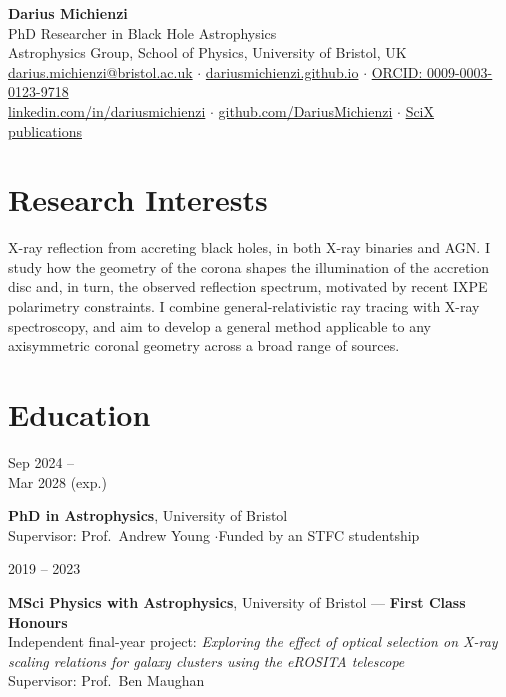 \documentclass[10pt,a4paper]{article}
\newcommand{\datewidth}{2.7cm}
\newcommand{\entry}[2]{%
  \par\noindent
  \begin{minipage}[t]{\datewidth}\raggedright\leavevmode\small\color{muted}\strut#1\end{minipage}%
  \hspace{0.4cm}%
  \begin{minipage}[t]{\dimexpr\textwidth-\datewidth-0.4cm\relax}\strut#2\strut\end{minipage}%
  \par\vspace{0.3em}}
\begin{document}
 
\begin{center}
  {\sffamily\fontsize{24}{28}\selectfont\bfseries Darius Michienzi}\\[0.4em]
  {\sffamily\color{muted} PhD Researcher in Black Hole Astrophysics}\\[0.5em]
  \small
  Astrophysics Group, School of Physics, University of Bristol, UK\\[0.2em]
  \href{mailto:darius.michienzi@bristol.ac.uk}{darius.michienzi@bristol.ac.uk}
  \quad$\cdot$\quad
  \href{https://dariusmichienzi.github.io}{dariusmichienzi.github.io}
  \quad$\cdot$\quad
  \href{https://orcid.org/0009-0003-0123-9718}{ORCID: 0009-0003-0123-9718}\\[0.2em]
  \href{https://www.linkedin.com/in/dariusmichienzi/}{linkedin.com/in/dariusmichienzi}
  \quad$\cdot$\quad
  \href{https://github.com/DariusMichienzi}{github.com/DariusMichienzi}
  \quad$\cdot$\quad
  \href{https://scixplorer.org/public-libraries/hmp3dQ2qQLWARLEJTIT1ng}{SciX publications}
\end{center}
 
\section{Research Interests}
X-ray reflection from accreting black holes, in both X-ray binaries and AGN.
I study how the geometry of the corona shapes the illumination of the accretion
disc and, in turn, the observed reflection spectrum, motivated by recent
IXPE polarimetry constraints. I combine general-relativistic ray tracing with
X-ray spectroscopy, and aim to develop a general method applicable to any
axisymmetric coronal geometry across a broad range of sources.
 
\section{Education}
\entry{Sep 2024 -- \\ Mar 2028 (exp.)}{%
  \textbf{PhD in Astrophysics}, University of Bristol\\
  Supervisor: Prof.\ Andrew Young \quad$\cdot$\quad Funded by an STFC studentship}
 
\entry{2019 -- 2023}{%
  \textbf{MSci Physics with Astrophysics}, University of Bristol --- \textbf{First Class Honours}\\
  Independent final-year project: \emph{Exploring the effect of optical selection on X-ray
  scaling relations for galaxy clusters using the eROSITA telescope}\\
  Supervisor: Prof.\ Ben Maughan}
 
\end{document}
